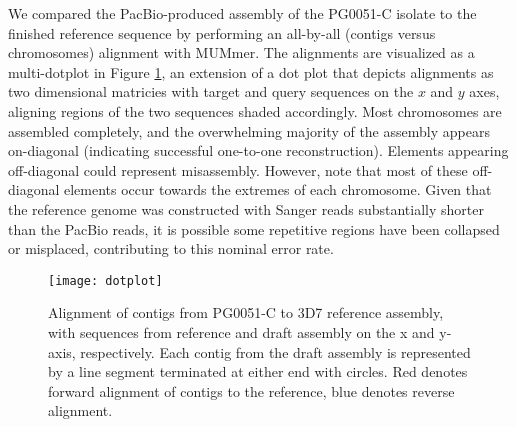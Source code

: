 We compared the PacBio-produced assembly of the PG0051-C isolate to the finished reference sequence by performing an all-by-all (contigs versus chromosomes) alignment with MUMmer\cite{Versatileandopens:2004dy}.  The alignments are visualized as a multi-dotplot in Figure \ref{fig:dotplot3D7}, an extension of a dot plot that depicts alignments as two dimensional matricies with target and query sequences on the $x$ and $y$ axes, aligning regions of the two sequences shaded accordingly\cite{Gibbs:1970jf}.  Most chromosomes are assembled completely, and the overwhelming majority of the assembly appears on-diagonal (indicating successful one-to-one reconstruction).  Elements appearing off-diagonal could represent misassembly.  However, note that most of these off-diagonal elements occur towards the extremes of each chromosome.  Given that the reference genome was constructed with Sanger reads substantially shorter than the PacBio reads, it is possible some repetitive regions have been collapsed or misplaced, contributing to this nominal error rate.

\begin{figure}[h!]
  \centering
    \texttt{[image: dotplot]}
  \caption{Alignment of contigs from PG0051-C to 3D7 reference assembly, with sequences from reference and draft assembly on the x and y-axis, respectively.  Each contig from the draft assembly is represented by a line segment terminated at either end with circles.  Red denotes forward alignment of contigs to the reference, blue denotes reverse alignment.}
  \label{fig:dotplot3D7}
\end{figure}


